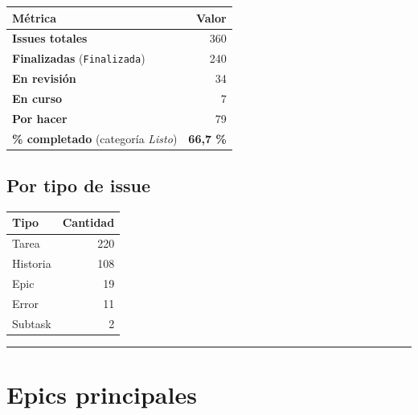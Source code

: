 \documentclass[
  spanish,
  11pt,
]{report}
\newcounter{none} %
\begin{document}
{\def\LTcaptype{none} %
\begin{longtable}[]{@{}lr@{}}
\toprule\noalign{}
Métrica & Valor \\
\midrule\noalign{}
\endhead
\bottomrule\noalign{}
\endlastfoot
\textbf{Issues totales} & 360 \\
\textbf{Finalizadas} (\texttt{Finalizada}) & 240 \\
\textbf{En revisión} & 34 \\
\textbf{En curso} & 7 \\
\textbf{Por hacer} & 79 \\
\textbf{\% completado} (categoría \emph{Listo}) & \textbf{66,7 \%} \\
\end{longtable}
}

\subsection{Por tipo de issue}\label{por-tipo-de-issue}

{\def\LTcaptype{none} %
\begin{longtable}[]{@{}lr@{}}
\toprule\noalign{}
Tipo & Cantidad \\
\midrule\noalign{}
\endhead
\bottomrule\noalign{}
\endlastfoot
Tarea & 220 \\
Historia & 108 \\
Epic & 19 \\
Error & 11 \\
Subtask & 2 \\
\end{longtable}
}

\begin{center}\rule{0.5\linewidth}{0.5pt}\end{center}

\section{Epics principales}\label{epics-principales}
\end{document}
